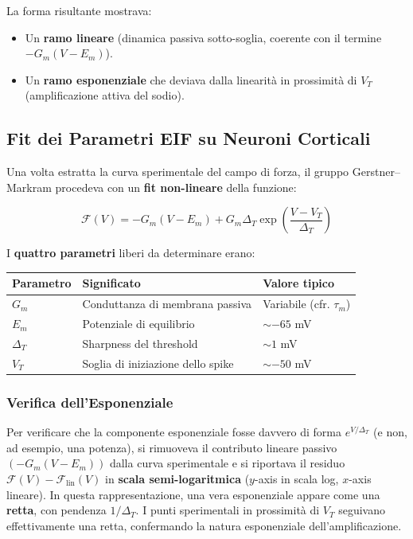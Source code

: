 La forma risultante mostrava:

\begin{itemize}
    \item Un \textbf{ramo lineare} (dinamica passiva sotto-soglia, coerente con il termine $-G_m(V - E_m)$).
    \item Un \textbf{ramo esponenziale} che deviava dalla linearità in prossimità di $V_T$ (amplificazione attiva del sodio).
\end{itemize}



\subsection{Fit dei Parametri EIF su Neuroni Corticali}

Una volta estratta la curva sperimentale del campo di forza, il gruppo Gerstner–Markram procedeva con un \textbf{fit non-lineare} della funzione:

\begin{equation}
\mathcal{F}(V) = -G_m(V - E_m) + G_m \Delta_T \exp\!\left(\frac{V - V_T}{\Delta_T}\right)
\end{equation}

I \textbf{quattro parametri} liberi da determinare erano:

\begin{table}[htbp]
    \centering
    \renewcommand{\arraystretch}{1.3}
    \begin{tabularx}{\textwidth}{|l|X|X|}
    \hline
    \textbf{Parametro} & \textbf{Significato} & \textbf{Valore tipico} \\
    \hline
    $G_m$ & Conduttanza di membrana passiva & Variabile (cfr. $\tau_m$) \\
    \hline
    $E_m$ & Potenziale di equilibrio & $\sim -65$ mV \\
    \hline
    $\Delta_T$ & Sharpness del threshold & $\sim 1$ mV \\
    \hline
    $V_T$ & Soglia di iniziazione dello spike & $\sim -50$ mV \\
    \hline
    \end{tabularx}
\end{table}

\subsubsection{Verifica dell'Esponenziale}

Per verificare che la componente esponenziale fosse davvero di forma $e^{V/\Delta_T}$ (e non, ad esempio, una potenza), si rimuoveva il contributo lineare passivo $(-G_m(V - E_m))$ dalla curva sperimentale e si riportava il residuo $\mathcal{F}(V) - \mathcal{F}_{\text{lin}}(V)$ in \textbf{scala semi-logaritmica} ($y$-axis in scala log, $x$-axis lineare). In questa rappresentazione, una vera esponenziale appare come una \textbf{retta}, con pendenza $1/\Delta_T$. I punti sperimentali in prossimità di $V_T$ seguivano effettivamente una retta, confermando la natura esponenziale dell'amplificazione.


